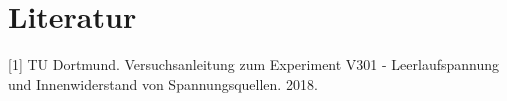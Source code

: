 \section{Literatur}

[1] TU Dortmund. Versuchsanleitung zum Experiment V301 - Leerlaufspannung und Innenwiderstand von Spannungsquellen. 2018. 